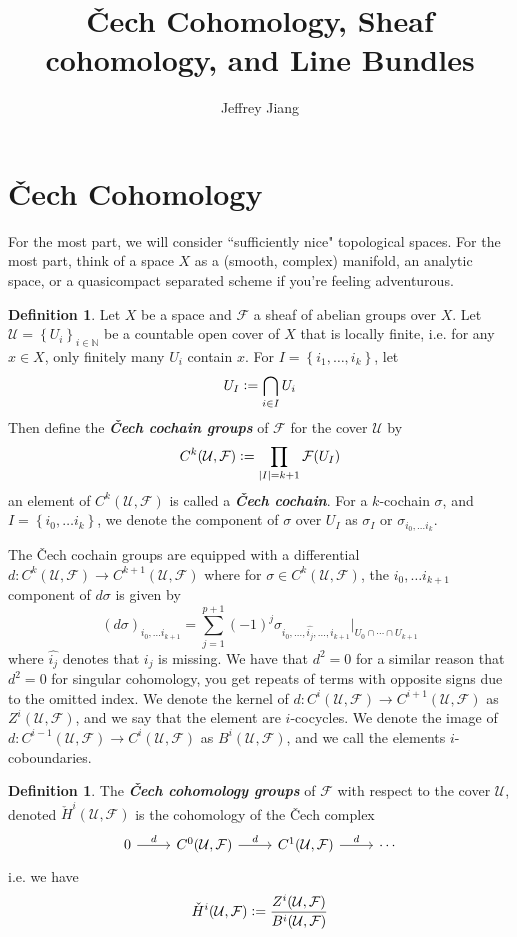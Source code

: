 \documentclass[psamsfonts, 12pt]{amsart}
\theoremstyle{definition}
\newtheorem{defn}[thm]{Definition}
\theoremstyle{remark}
\newcommand{\ib}[1]{\textbf{\textit{#1}}}
\newcommand{\N}{\mathbb{N}}
\newcommand{\set}[1]{\left\lbrace #1 \right\rbrace}
\newcommand{\defeq}{\vcentcolon=}
\begin{document}
%
\author{Jeffrey Jiang}
%
\title{\v{C}ech Cohomology, Sheaf cohomology, and Line Bundles}
%
\maketitle
%
\section{\v{C}ech Cohomology}
%
For the most part, we will consider ``sufficiently nice" topological spaces.
For the most part, think of a space $X$ as a (smooth, complex) manifold, an analytic
space, or a quasicompact separated scheme if you're feeling adventurous.
%
\begin{defn}
Let $X$ be a space and $\mathcal{F}$ a sheaf of abelian groups over $X$. Let
$\mathcal{U} = \set{U_i}_{i \in \N}$ be a countable open cover of $X$ that is locally
finite, i.e. for any $x \in X$, only finitely many $U_i$ contain $x$. For
$I = \set{i_1, \ldots, i_k}$, let
\[
U_I \defeq \bigcap_{i \in I} U_i
\]
Then define the \ib{\v{C}ech cochain groups} of $\mathcal{F}$ for the cover
$\mathcal{U}$ by
\begin{align*}
C^k(\mathcal{U}, \mathcal{F}) \defeq \prod_{|I| = k+1} \mathcal{F}(U_I)
\end{align*}
an element of $C^k(\mathcal{U},\mathcal{F})$ is called a \ib{\v{C}ech cochain}.
For a $k$-cochain $\sigma$, and $I = \set{i_0,\ldots i_k}$, we denote the
component of $\sigma$ over $U_I$ as $\sigma_I$ or $\sigma_{i_0,\ldots i_k}$.
\end{defn}
%
The \v{C}ech cochain groups are equipped with a differential
$d : C^k(\mathcal{U}, \mathcal{F}) \to C^{k+1}(\mathcal{U}, \mathcal{F})$
where for $\sigma \in C^k(\mathcal{U}, \mathcal{F})$, the ${i_0, \ldots i_{k+1}}$
component of $d\sigma$ is given by
\[
(d\sigma)_{i_0, \ldots i_{k+1}}
= \sum_{j = 1}^{p+1}(-1)^j\sigma_{i_0, \ldots, \widehat{i_j}, \ldots, i_{k+1}}
\vert_{U_0 \cap \cdots \cap U_{k+1}}
\]
where $\widehat{i_j}$ denotes that $i_j$ is missing. We have that $d^2 = 0$ for a
similar reason that $d^2 = 0$ for singular cohomology, you get repeats of
terms with opposite signs due to the omitted index. We denote the kernel of
$d : C^i(\mathcal{U}, \mathcal{F}) \to C^{i+1}(\mathcal{U}, \mathcal{F})$ as
$Z^i(\mathcal{U}, \mathcal{F})$, and we say that the element are $i$-cocycles.
We denote the image of
$d : C^{i-1}(\mathcal{U}, \mathcal{F}) \to C^i(\mathcal{U}, \mathcal{F})$ as
$B^i(\mathcal{U}, \mathcal{F})$, and we call the elements $i$-coboundaries.
%
\begin{defn}
The \ib{\v{C}ech cohomology groups} of $\mathcal{F}$ with respect to the cover
$\mathcal{U}$, denoted $\check{H}^i(\mathcal{U}, \mathcal{F})$ is the cohomology of
the \v{C}ech complex
\[\begin{tikzcd}
0 \ar[r, "d"] & C^0(\mathcal{U}, \mathcal{F}) \ar[r, "d"] &
C^1(\mathcal{U}, \mathcal{F}) \ar[r, "d"]
& \cdots
\end{tikzcd}\]
i.e. we have
\[
\check{H}^i(\mathcal{U}, \mathcal{F}) \defeq
\frac{Z^i(\mathcal{U}, \mathcal{F})}{B^i(\mathcal{U}, \mathcal{F})}
\]
\end{defn}
\end{document}
